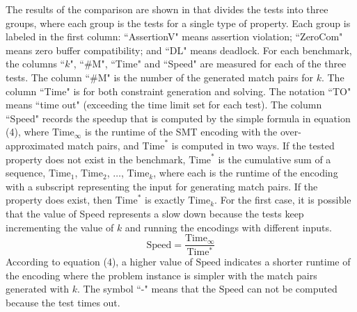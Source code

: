 The results of the comparison are shown in  that divides the tests into three groups, where each group is the tests for a single type of property. Each group is labeled in the first column: ``AssertionV" means assertion violation; ``ZeroCom" means zero buffer compatibility; and ``DL" means deadlock. For each benchmark, the columns ``$k$", ``\#M", ``Time" and ``Speed" are measured for each of the three tests. The column ``\#M" is the number of the generated match pairs for $k$. The column ``Time" is for both constraint generation and solving. The notation ``TO" means ``time out" (exceeding the time limit set for each test). The column ``Speed" records the speedup that is computed by the simple formula in equation (4), where $\mathrm{Time}_\infty$ is the runtime of the SMT encoding with the over-approximated match pairs, and $\mathrm{Time}^\ast$ is computed in two ways. If the tested property does not exist in the benchmark, $\mathrm{Time}^\ast$ is the cumulative sum of a sequence, $\mathrm{Time}_1$, $\mathrm{Time}_2$, $\dots$, $\mathrm{Time}_k$, where each is the runtime of the encoding with a subscript representing the input for generating match pairs. If the property does exist, then $\mathrm{Time}^\ast$ is exactly $\mathrm{Time}_k$.
For the first case, it is possible that the value of Speed represents a slow down because the tests keep incrementing the value of $k$ and running the encodings with different inputs.
\begin{equation}
\mathrm{Speed} = \frac{\mathrm{Time_{\infty}}}{\mathrm{Time^{\ast}}}
\end{equation}
According to equation (4), a higher value of $\mathrm{Speed}$ indicates a shorter runtime of the encoding where the problem instance is simpler with the match pairs generated with $k$.
The symbol ``-" means that the $\mathrm{Speed}$ can not be computed because the test times out.

